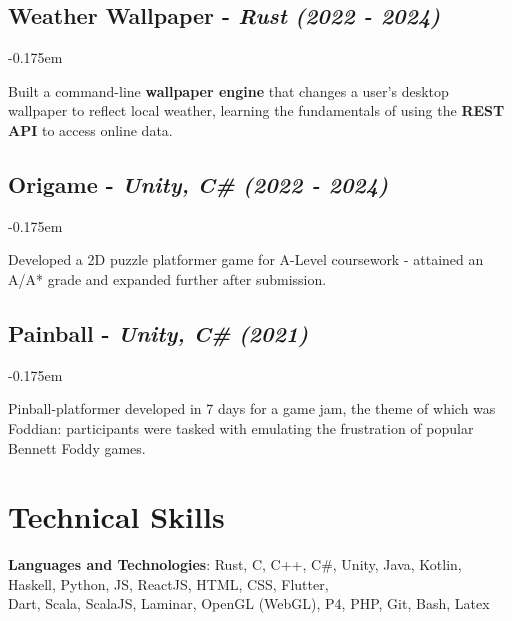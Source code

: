 \documentclass{article}
\newcommand{\dates}[1]{\hfill\textit{(#1)}}
\newcommand{\indentsubsection}[2]{
    \subsection*{#1}
    #2
}
\newcommand{\project}[4]{
    \indentsubsection{\textbf{#1} - \textit{#3} \dates{#2}}
    \vspace{-0.175em}
    \begin{minipage}{\dimexpr\textwidth - 2em}
        #4
    \end{minipage}    
    \hfill
    \vspace{-0.15em}
}
\begin{document}
\project{Weather Wallpaper}{2022 - 2024}{Rust}{
    Built a command-line \textbf{wallpaper engine} that changes a user's desktop wallpaper to reflect local weather, learning the fundamentals 
    of using the \textbf{REST API} to access online data.
}

\project{Origame}{2022 - 2024}{Unity, C\#}{
    Developed a 2D puzzle platformer game for A-Level coursework - attained an A/A* grade and expanded further after submission. 
}

\project{Painball}{2021}{Unity, C\#}{
    Pinball-platformer developed in 7 days for a game jam, the theme of which was Foddian: 
    participants were tasked with emulating the frustration of popular Bennett Foddy games.
}
    

\section*{Technical Skills}

\textbf{Languages and Technologies}: 
    Rust, C, C++, C\#, Unity, Java, Kotlin, Haskell, Python, JS, ReactJS, HTML, CSS, Flutter, \\
    \indent Dart, Scala, ScalaJS, Laminar, OpenGL (WebGL), P4, PHP, Git, Bash, Latex
\end{document}
